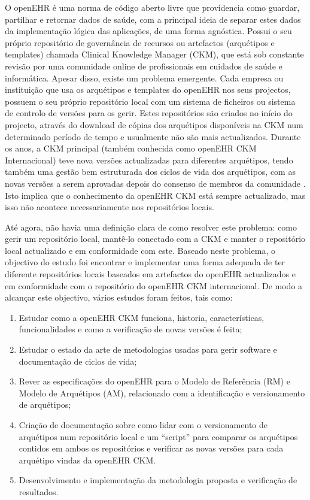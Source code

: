 \documentclass[mim_thesis.tex]{subfiles}
\begin{document}
O openEHR é uma norma de código aberto livre que providencia como guardar, partilhar e retornar dados de saúde, com a principal ideia de separar estes dados da implementação lógica das aplicações, de uma forma agnóstica. Possui o seu próprio repositório de governância de recursos ou artefactos (arquétipos e templates) chamada Clinical Knowledge Manager (CKM), que está sob constante revisão por uma comunidade online de profissionais em cuidados de saúde e informática. Apesar disso, existe um problema emergente. Cada empresa ou instituição que usa os arquétipos e templates do openEHR nos seus projectos, possuem o seu próprio repositório local com um sistema de ficheiros ou sistema de controlo de versões para os gerir. Estes repositórios são criados no início do projecto, através do download de cópias dos arquétipos disponíveis na CKM num determinado período de tempo e usualmente não são mais actualizados. Durante os anos, a CKM principal (também conhecida como openEHR CKM Internacional) teve nova versões actualizadas para diferentes arquétipos, tendo também uma gestão bem estruturada dos ciclos de vida dos arquétipos, com as novas versões a serem aprovadas depois do consenso de membros da comunidade \citep{Leslie2017}. Isto implica que o conhecimento da openEHR CKM está sempre actualizado, mas isso não acontece necessariamente nos repositórios locais.

Até agora, não havia uma definição clara de como resolver este problema: como gerir um repositório local, mantê-lo conectado com a CKM e manter o repositório local actualizado e em conformidade com este. Baseado neste problema, o objectivo do estudo foi encontrar e implementar uma forma adequada de ter diferente repositórios locais baseados em artefactos do openEHR actualizados e em conformidade com o repositório do openEHR CKM internacional. De modo a alcançar este objectivo, vários estudos foram feitos, tais como:
\begin{enumerate} [noitemsep]
\item Estudar como a openEHR CKM funciona, historia, características, funcionalidades e como a verificação de novas versões é feita;
\item Estudar o estado da arte de metodologias usadas para gerir software e documentação de ciclos de vida;
\item Rever as especificações do openEHR para o Modelo de Referência (RM) e Modelo de Arquétipos (AM), relacionado com a identificação e versionamento de arquétipos;
\item Criação de documentação sobre como lidar com o versionamento de arquétipos num repositório local e um “script” para comparar os arquétipos contidos em ambos os repositórios e verificar as novas versões para cada arquétipo vindas da openEHR CKM.
\item Desenvolvimento e implementação da metodologia proposta e verificação de resultados.
\end{enumerate}
\end{document}
